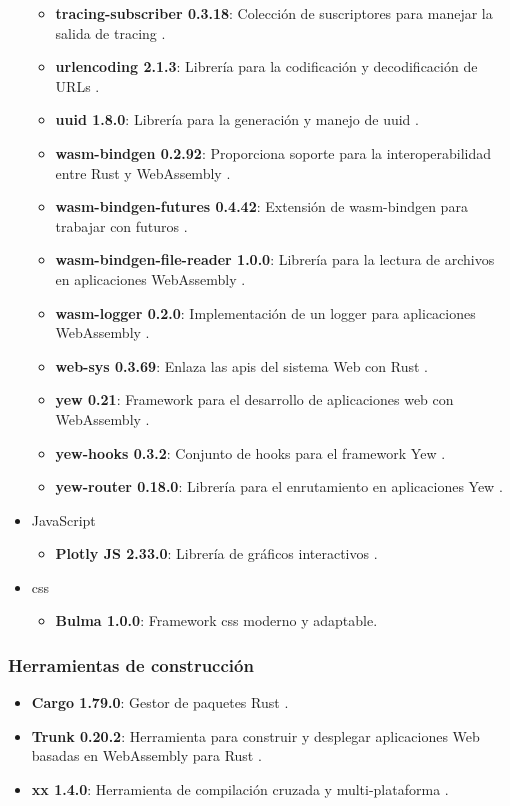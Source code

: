 \begin{itemize}
\begin{itemize}
    \item \textbf{tracing-subscriber 0.3.18}: Colección de suscriptores para manejar la salida de tracing \cite{tracing_subscriber}.
    \item \textbf{urlencoding 2.1.3}: Librería para la codificación y decodificación de URLs \cite{urlencoding}.
    \item \textbf{uuid 1.8.0}: Librería para la generación y manejo de \ac{uuid} \cite{uuid}.
    \item \textbf{wasm-bindgen 0.2.92}: Proporciona soporte para la interoperabilidad entre Rust y WebAssembly \cite{wasm_bindgen}.
    \item \textbf{wasm-bindgen-futures 0.4.42}: Extensión de wasm-bindgen para trabajar con futuros \cite{wasm_bindgen_futures}.
    \item \textbf{wasm-bindgen-file-reader 1.0.0}: Librería para la lectura de archivos en aplicaciones WebAssembly \cite{wasm_bindgen_file_reader}.
    \item \textbf{wasm-logger 0.2.0}: Implementación de un logger para aplicaciones WebAssembly \cite{wasm_logger}.
    \item \textbf{web-sys 0.3.69}: Enlaza las \ac{api}s del sistema Web con Rust \cite{web_sys}.
    \item \textbf{yew 0.21}: Framework para el desarrollo de aplicaciones web con WebAssembly \cite{yew}.
    \item \textbf{yew-hooks 0.3.2}: Conjunto de hooks para el framework Yew \cite{yew_hooks}.
    \item \textbf{yew-router 0.18.0}: Librería para el enrutamiento en aplicaciones Yew \cite{yew_router}.
    \end{itemize}
\item JavaScript
    \begin{itemize}
    \item \textbf{Plotly JS 2.33.0}: Librería de gráficos interactivos \cite{plotly_js}.
    \end{itemize}
\item \ac{css}
    \begin{itemize}
    \item \textbf{Bulma 1.0.0}: Framework \ac{css} moderno y adaptable. 
    \end{itemize}
\end{itemize}

\subsubsection*{Herramientas de construcción}
\begin{itemize}
\item \textbf{Cargo 1.79.0}: Gestor de paquetes Rust \cite{rust_cargo}.
\item \textbf{Trunk 0.20.2}: Herramienta para construir y desplegar aplicaciones Web basadas en WebAssembly para Rust \cite{trunk}.
\item \textbf{xx 1.4.0}: Herramienta de compilación cruzada y multi-plataforma \cite{xx}.
\end{itemize}

